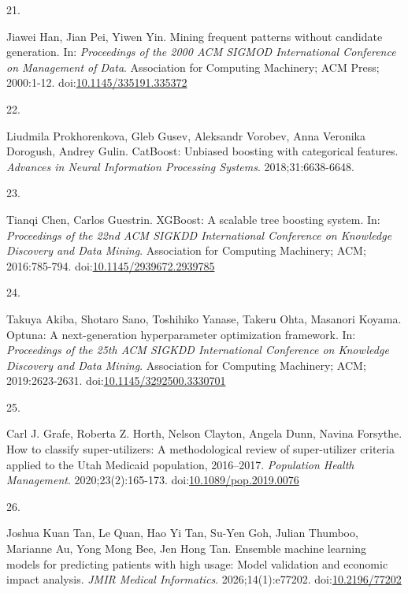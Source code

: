 \documentclass[
  12pt,
]{book}
\newlength{\cslhangindent}
\newlength{\csllabelwidth}
\newenvironment{CSLReferences}[2] %
 {\begin{list}{}{%
  \setlength{\itemindent}{0pt}
  \setlength{\leftmargin}{0pt}
  \setlength{\parsep}{0pt}
  \ifodd #1
   \setlength{\leftmargin}{\cslhangindent}
   \setlength{\itemindent}{-1\cslhangindent}
  \fi
  \setlength{\itemsep}{#2\baselineskip}}}
 {\end{list}}
\newcommand{\CSLLeftMargin}[1]{\parbox[t]{\csllabelwidth}{\strut#1\strut}}
\newcommand{\CSLRightInline}[1]{\parbox[t]{\linewidth - \csllabelwidth}{\strut#1\strut}}
\begin{document}
\begin{CSLReferences}{0}{1}
\CSLLeftMargin{21. }%
\CSLRightInline{Jiawei Han, Jian Pei, Yiwen Yin. Mining frequent
patterns without candidate generation. In: \emph{Proceedings of the 2000
ACM SIGMOD International Conference on Management of Data}. Association
for Computing Machinery; ACM Press; 2000:1-12.
doi:\href{https://doi.org/10.1145/335191.335372}{10.1145/335191.335372}}

\CSLLeftMargin{22. }%
\CSLRightInline{Liudmila Prokhorenkova, Gleb Gusev, Aleksandr Vorobev,
Anna Veronika Dorogush, Andrey Gulin. {CatBoost}: Unbiased boosting with
categorical features. \emph{Advances in Neural Information Processing
Systems}. 2018;31:6638-6648.}

\CSLLeftMargin{23. }%
\CSLRightInline{Tianqi Chen, Carlos Guestrin. {XGBoost}: A scalable tree
boosting system. In: \emph{Proceedings of the 22nd ACM SIGKDD
International Conference on Knowledge Discovery and Data Mining}.
Association for Computing Machinery; ACM; 2016:785-794.
doi:\href{https://doi.org/10.1145/2939672.2939785}{10.1145/2939672.2939785}}

\CSLLeftMargin{24. }%
\CSLRightInline{Takuya Akiba, Shotaro Sano, Toshihiko Yanase, Takeru
Ohta, Masanori Koyama. Optuna: {A} next-generation hyperparameter
optimization framework. In: \emph{Proceedings of the 25th ACM SIGKDD
International Conference on Knowledge Discovery and Data Mining}.
Association for Computing Machinery; ACM; 2019:2623-2631.
doi:\href{https://doi.org/10.1145/3292500.3330701}{10.1145/3292500.3330701}}

\CSLLeftMargin{25. }%
\CSLRightInline{Carl J. Grafe, Roberta Z. Horth, Nelson Clayton, Angela
Dunn, Navina Forsythe. How to classify super-utilizers: A methodological
review of super-utilizer criteria applied to the {Utah} {Medicaid}
population, 2016--2017. \emph{Population Health Management}.
2020;23(2):165-173.
doi:\href{https://doi.org/10.1089/pop.2019.0076}{10.1089/pop.2019.0076}}

\CSLLeftMargin{26. }%
\CSLRightInline{Joshua Kuan Tan, Le Quan, Hao Yi Tan, Su-Yen Goh, Julian
Thumboo, Marianne Au, Yong Mong Bee, Jen Hong Tan. Ensemble machine
learning models for predicting patients with high usage: Model
validation and economic impact analysis. \emph{JMIR Medical
Informatics}. 2026;14(1):e77202.
doi:\href{https://doi.org/10.2196/77202}{10.2196/77202}}


\end{CSLReferences}
\end{document}
